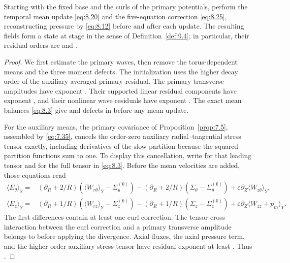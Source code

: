 \begin{proposition}\label{prop:9.5}
Starting with the fixed base and the curls of the primary potentials, perform the temporal mean
update \eqref{eq:8.20} and the five-equation correction \eqref{eq:8.25}, reconstructing pressure by
\eqref{eq:8.12} before and after each update. The resulting fields form a state at stage
 in the sense of Definition~\ref{def:9.4}; in particular, their residual orders
are  and .
\end{proposition}

\begin{proof}
We first estimate the primary waves, then remove the torus-dependent means and the three moment
defects. The initialization uses the higher decay order of the auxiliary-averaged primary residual.
The primary transverse amplitudes have exponent . Their supported linear
residual components have exponent , and their nonlinear wave
residuals have
%
exponent . The exact mean balances \eqref{eq:8.3} give
 and defects in
 before any mean update.

For the auxiliary means, the primary covariance of Proposition~\ref{prop:7.5}, assembled by
\eqref{eq:7.35}, cancels the order-zero auxiliary radial--tangential stress tensor exactly, including
derivatives of the slow partition because the squared partition functions sum to one. To display this
cancellation, write  for that leading tensor and
 for the full tensor in \eqref{eq:8.3}. Before the mean velocities are
added, those equations read
\begin{equation}
\begin{aligned}
\langle E_\theta\rangle_Y
={}&(\partial_R+2/R)(\langle W_{r\theta}\rangle_Y-\Sigma_\theta^{(0)})
 -(\partial_R+2/R)(\Sigma_\theta-\Sigma_\theta^{(0)})
 +\varepsilon\partial_Z\langle W_{z\theta}\rangle_Y,\\
\langle E_z\rangle_Y
={}&(\partial_R+1/R)(\langle W_{rz}\rangle_Y-\Sigma_z^{(0)})
 -(\partial_R+1/R)(\Sigma_z-\Sigma_z^{(0)})
 +\varepsilon\partial_Z\langle W_{zz}+p_m\rangle_Y.
\end{aligned}
\tag{9.11}\label{eq:9.11}
\end{equation}
The first differences contain at least one curl correction. The tensor cross interaction between the
curl correction and a primary transverse amplitude belongs to
 before applying the divergence. Axial fluxes, the
axial pressure term, and the higher-order auxiliary stress tensor have residual exponent at least
. Thus
.


\end{proof}
